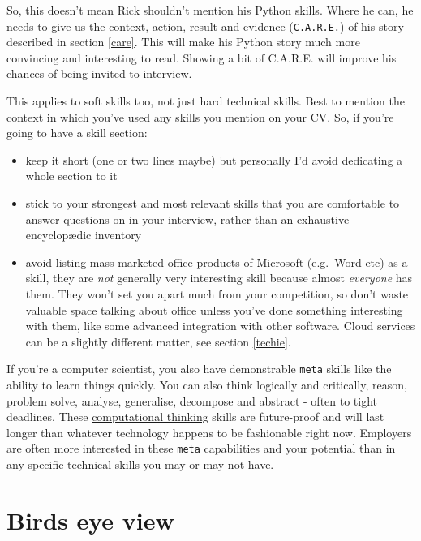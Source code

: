 \documentclass[
]{book}
\providecommand{\tightlist}{%
  \setlength{\itemsep}{0pt}\setlength{\parskip}{0pt}}
\begin{document}
So, this doesn't mean Rick shouldn't mention his Python skills. Where he can, he needs to give us the context, action, result and evidence (\texttt{C.A.R.E.}) of his story described in section \ref{care}. This will make his Python story much more convincing and interesting to read. Showing a bit of C.A.R.E. will improve his chances of being invited to interview.

This applies to soft skills too, not just hard technical skills. Best to mention the context in which you've used any skills you mention on your CV. So, if you're going to have a skill section:

\begin{itemize}
\tightlist
\item
  keep it short (one or two lines maybe) but personally I'd avoid dedicating a whole section to it
\item
  stick to your strongest and most relevant skills that you are comfortable to answer questions on in your interview, rather than an exhaustive encyclopædic inventory
\item
  avoid listing mass marketed office products of Microsoft (e.g.~Word etc) as a skill, they are \emph{not} generally very interesting skill because almost \emph{everyone} has them. They won't set you apart much from your competition, so don't waste valuable space talking about office unless you've done something interesting with them, like some advanced integration with other software. Cloud services can be a slightly different matter, see section \ref{techie}.
\end{itemize}

If you're a computer scientist, you also have demonstrable \texttt{meta} skills like the ability to learn things quickly. You can also think logically and critically, reason, problem solve, analyse, generalise, decompose and abstract - often to tight deadlines. These \href{https://en.wikipedia.org/wiki/Computational_thinking}{computational thinking} skills are future-proof and will last longer than whatever technology happens to be fashionable right now. Employers are often more interested in these \texttt{meta} capabilities and your potential than in any specific technical skills you may or may not have.

\hypertarget{birds-eye-view}{%
\section{Birds eye view}\label{birds-eye-view}}
\end{document}
